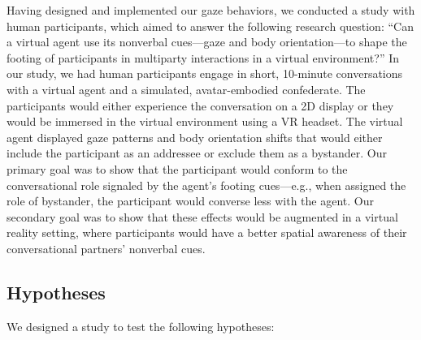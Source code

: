 Having designed and implemented our gaze behaviors, we conducted a study with human participants, which aimed to answer the following research question: ``Can a virtual agent use its nonverbal cues---gaze and body orientation---to shape the footing of participants in multiparty interactions in a virtual environment?'' In our study, we had human participants engage in short, 10-minute conversations with a virtual agent and a simulated, avatar-embodied confederate. The participants would either experience the conversation on a 2D display or they would be immersed in the virtual environment using a VR headset. The virtual agent displayed gaze patterns and body orientation shifts that would either include the participant as an addressee or exclude them as a bystander. Our primary goal was to show that the participant would conform to the conversational role signaled by the agent's footing cues---e.g., when assigned the role of bystander, the participant would converse less with the agent. Our secondary goal was to show that these effects would be augmented in a virtual reality setting, where participants would have a better spatial awareness of their conversational partners' nonverbal cues.

\subsection{Hypotheses}

We designed a study to test the following hypotheses:

